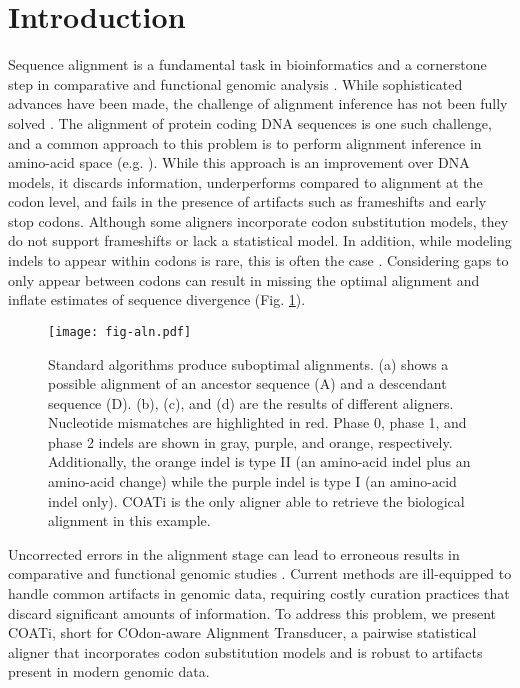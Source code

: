 \section*{Introduction}

Sequence alignment is a fundamental task in bioinformatics and a cornerstone step in comparative and functional genomic analysis . While sophisticated advances have been made, the challenge of alignment inference has not been fully solved .
%
The alignment of protein coding DNA sequences is one such challenge, and a common approach to this problem is to perform alignment inference in amino-acid space (e.g. ).
While this approach is an improvement over DNA models, it discards information, underperforms compared to alignment at the codon level, and fails in the presence of artifacts such as frameshifts and early stop codons.
Although some aligners incorporate codon substitution models, they do not support frameshifts or lack a statistical model.
In addition, while modeling indels to appear within codons is rare, this is often the case .
Considering gaps to only appear between codons can result in missing the optimal alignment and inflate estimates of sequence divergence (Fig. \ref{fig:aln}).

\begin{figure}[h!]
    \centering%
    \texttt{[image: fig-aln.pdf]}
    \par
    \caption{
        Standard algorithms produce suboptimal alignments.
        (a) shows a possible alignment of an ancestor sequence (A) and a descendant sequence (D).
        (b), (c), and (d) are the results of different aligners.
        Nucleotide mismatches are highlighted in red. Phase 0, phase 1, and phase 2 indels are shown in gray, purple, and orange, respectively.
        Additionally, the orange indel is type II (an amino-acid indel plus an amino-acid change) while the purple indel is type I (an amino-acid indel only).
        COATi is the only aligner able to retrieve the biological alignment in this example.
        }
    \label{fig:aln}
\end{figure}

Uncorrected errors in the alignment stage can lead to erroneous results in comparative and functional genomic studies .
Current methods are ill-equipped to handle common artifacts in genomic data, requiring costly curation practices that discard significant amounts of information.
To address this problem, we present COATi, short for COdon-aware Alignment Transducer, a pairwise statistical aligner that incorporates codon substitution models and is robust to artifacts present in modern genomic data.

